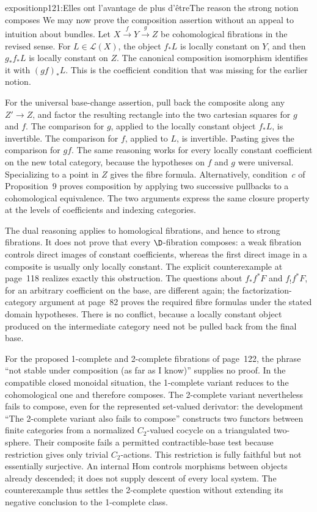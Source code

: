 \begin{dcomment}{exposition}{p121:Elles ont l'avantage de plus d'être}{The reason the strong notion composes}
We may now prove the composition assertion without an appeal to intuition about bundles. Let $X\xrightarrow{f}Y\xrightarrow{g}Z$ be cohomological fibrations in the revised sense. For $L\in\mathcal L(X)$, the object $f_*L$ is locally constant on $Y$, and then $g_*f_*L$ is locally constant on $Z$. The canonical composition isomorphism identifies it with $(gf)_*L$. This is the coefficient condition that was missing for the earlier notion.

For the universal base-change assertion, pull back the composite along any $Z'\to Z$, and factor the resulting rectangle into the two cartesian squares for $g$ and $f$. The comparison for $g$, applied to the locally constant object $f_*L$, is invertible. The comparison for $f$, applied to $L$, is invertible. Pasting gives the comparison for $gf$. The same reasoning works for every locally constant coefficient on the new total category, because the hypotheses on $f$ and $g$ were universal. Specializing to a point in $Z$ gives the fibre formula. Alternatively, condition~$c$ of Proposition~9 proves composition by applying two successive pullbacks to a cohomological equivalence. The two arguments express the same closure property at the levels of coefficients and indexing categories.

The dual reasoning applies to homological fibrations, and hence to strong fibrations. It does not prove that every $\D$-fibration composes: a weak fibration controls direct images of constant coefficients, whereas the first direct image in a composite is usually only locally constant. The explicit counterexample at page~118 realizes exactly this obstruction. The questions about $f_*f^*F$ and $f_!f^*F$, for an arbitrary coefficient on the base, are different again; the factorization-category argument at page~82 proves the required fibre formulas under the stated domain hypotheses. There is no conflict, because a locally constant object produced on the intermediate category need not be pulled back from the final base.

For the proposed 1-complete and 2-complete fibrations of page~122, the phrase ``not stable under composition (as far as I know)'' supplies no proof. In the compatible closed monoidal situation, the 1-complete variant reduces to the cohomological one and therefore composes. The 2-complete variant nevertheless fails to compose, even for the represented set-valued derivator: the development ``The 2-complete variant also fails to compose'' constructs two functors between finite categories from a normalized $C_2$-valued cocycle on a triangulated two-sphere. Their composite fails a permitted contractible-base test because restriction gives only trivial $C_2$-actions. This restriction is fully faithful but not essentially surjective. An internal Hom controls morphisms between objects already descended; it does not supply descent of every local system. The counterexample thus settles the 2-complete question without extending its negative conclusion to the 1-complete class.
\end{dcomment}

